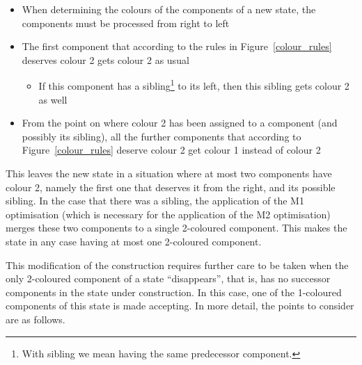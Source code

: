 \begin{itemize}
\item When determining the colours of the components of a new state, the components must be processed from right to left
\item The first component that according to the rules in Figure~\ref{colour_rules} deserves colour 2 gets colour 2 as usual
  \begin{itemize}
  \item If this component has a sibling\footnote{With sibling we mean having the same predecessor component.} to its left, then this sibling gets colour 2 as well
  \end{itemize}
\item From the point on where colour 2 has been assigned to a component (and possibly its sibling), all the further components that according to Figure~\ref{colour_rules} deserve colour 2 get colour 1 instead of colour 2
\end{itemize}

This leaves the new state in a situation where at most two components have colour 2, namely the first one that deserves it from the right, and its possible sibling. In the case that there was a sibling, the application of the M1 optimisation (which is necessary for the application of the M2 optimisation) merges these two components to a single 2-coloured component. This makes the state in any case having at most one 2-coloured component.

This modification of the construction requires further care to be taken when the only 2-coloured component of a state ``disappears'', that is, has no successor components in the state under construction. In this case, one of the 1-coloured components of this state is made accepting. In more detail, the points to consider are as follows.

